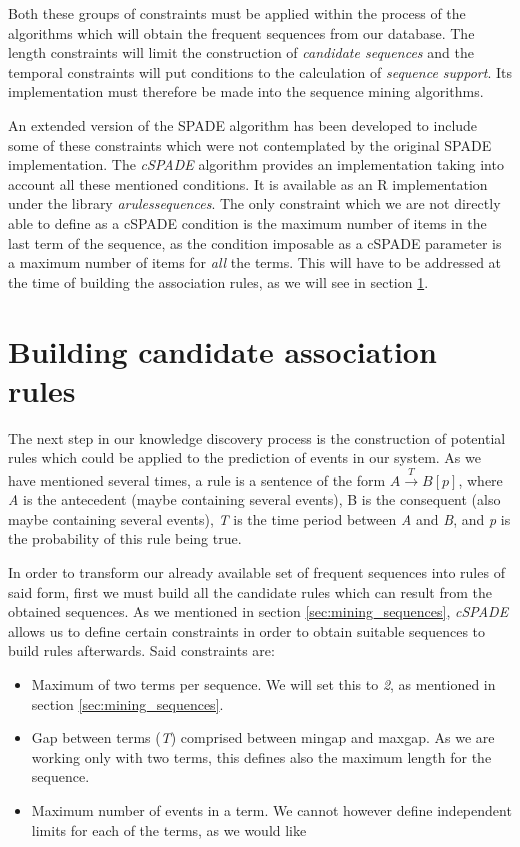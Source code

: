 \documentclass[a4paper,12pt]{article}
\begin{document}
Both these groups of constraints must be applied within the process of the algorithms which will obtain the frequent sequences from our database. The length constraints will limit the construction of \emph{candidate sequences} and the temporal constraints will put conditions to the calculation of \emph{sequence support}. Its implementation must therefore be made into the sequence mining algorithms.

An extended version of the SPADE algorithm has been developed to include some of these constraints which were not contemplated by the original SPADE implementation. The \emph{cSPADE} algorithm\cite{zaki2000cspade,wu2010sequential} provides an implementation taking into account all these mentioned conditions. It is available as an R implementation under the library \emph{arulessequences}\cite{hahsler2011arules}. The only constraint which we are not directly able to define as a cSPADE condition is the maximum number of items in the last term of the sequence, as the condition imposable as a cSPADE parameter is a maximum number of items for \emph{all} the terms. This will have to be addressed at the time of building the association rules, as we will see in section \ref{sec:assoc_rules}.

\section{Building candidate association rules} \label{sec:assoc_rules}
The next step in our knowledge discovery process is the construction of potential rules which could be applied to the prediction of events in our system. As we have mentioned several times, a rule is a sentence of the form ${A} \xrightarrow{T} {B} [p]$, where \emph{A} is the antecedent (maybe containing several events), B is the consequent (also maybe containing several events), \emph{T} is the time period between \emph{A} and \emph{B}, and \emph{p} is the probability of this rule being true.

In order to transform our already available set of frequent sequences into rules of said form, first we must build all the candidate rules which can result from the obtained sequences. As we mentioned in section \ref{sec:mining_sequences}, \emph{cSPADE} allows us to define certain constraints in order to obtain suitable sequences to build rules afterwards. Said constraints are:

\begin{itemize}
\item Maximum of two terms per sequence. We will set this to \emph{2}, as mentioned in section \ref{sec:mining_sequences}.
\item Gap between terms (\emph{T}) comprised between mingap and maxgap. As we are working only with two terms, this defines also the maximum length for the sequence.
\item Maximum number of events in a term. We cannot however define independent limits for each of the terms, as we would like
\end{itemize}
\end{document}
